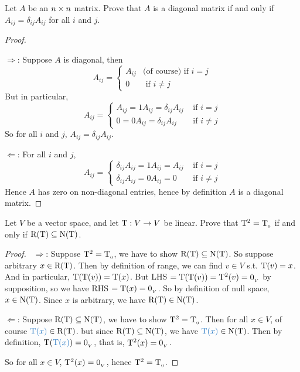 \begin{exercise} \label{exercise 2.3.10}
Let \(A\) be an \(n \times n\) matrix.
Prove that \(A\) is a diagonal matrix if and only if \(A_{ij} = \delta_{ij} A_{ij}\) for all \(i\) and \(j\).
\end{exercise}

\begin{proof} \ 

\(\Longrightarrow\):
Suppose \(A\) is diagonal, then
\begin{equation*}
    A_{ij} = \begin{cases}
        A_{ij} & \text{(of course) if } i = j \\
        0 & \text{ if } i \ne j
    \end{cases}
\end{equation*}
But in particular,
\begin{equation*}
    A_{ij} = \begin{cases}
        A_{ij} = 1 A_{ij} = \delta_{ij} A_{ij} & \text{ if } i = j \\
        0 = 0 A_{ij} = \delta_{ij} A_{ij} & \text{ if } i \ne j
    \end{cases}
\end{equation*}
So for all \(i\) and \(j\), \(A_{ij} = \delta_{ij} A_{ij}\).

\(\Longleftarrow\):
For all \(i\) and \(j\),
\begin{equation*}
    A_{ij} = \begin{cases}
        \delta_{ij} A_{ij} = 1 A_{ij} = A_{ij} & \text{ if } i = j \\
        \delta_{ij} A_{ij} = 0 A_{ij} = 0 & \text{ if } i \ne j
    \end{cases}
\end{equation*}
Hence \(A\) has zero on non-diagonal entries, hence by definition \(A\) is a diagonal matrix.
\end{proof}

\begin{exercise} \label{exercise 2.3.11}
Let \(V\) be a vector space, and let \(\mathrm{T} : V \to V\) be linear.
Prove that \(\mathrm{T}^2 = \mathrm{T}_{_0}\) if and only if \(\mathrm{R(T)} \subseteq \mathrm{N(T)}\).
\end{exercise}

\begin{proof} \ 
\(\Longrightarrow\): Suppose \(\mathrm{T}^2 = \mathrm{T}_{_0}\), we have to show \(\mathrm{R(T)} \subseteq \mathrm{N(T)}\).
So suppose arbitrary \(x \in \mathrm{R(T)}\).
Then by definition of range, we can find \(v \in V\) s.t. \(\mathrm{T}(v) = x\).
And in particular, \(\mathrm{T}(\mathrm{T}(v)) = \mathrm{T}(x)\).
But LHS \(= \mathrm{T}(\mathrm{T}(v)) = \mathrm{T}^2(v) = 0_{_V}\) by supposition, so we have RHS \(= \mathrm{T}(x) = 0_{_V}\).
So by definition of null space, \(x \in \mathrm{N(T)}\).
Since \(x\) is arbitrary, we have \(\mathrm{R(T)} \in \mathrm{N(T)}\).

\(\Longleftarrow\): Suppose \(\mathrm{R(T)} \subseteq \mathrm{N(T)}\), we have to show \(\mathrm{T}^2 = \mathrm{T}_{_0}\).
Then for all \(x \in V\), of course \(\BLUE{\T(x)} \in \RANGET\). but since \(\mathrm{R(T)} \subseteq \mathrm{N(T)}\), we have \(\BLUE{\T(x)} \in \NULLT\).
Then by definition, \(\T(\BLUE{\T(x)}) = \OV\), that is, \(\mathrm{T}^2(x) = 0_{_V}\).

So for all \(x \in V\), \(\mathrm{T}^2(x) = 0_{_V}\), hence \(\mathrm{T}^2 = \mathrm{T}_{_0}\).
\end{proof}

